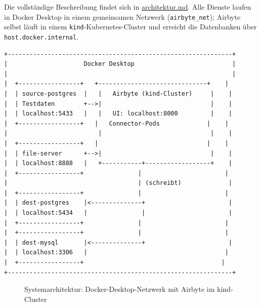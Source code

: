 \documentclass[a4paper,12pt]{article}
\begin{document}
Die vollständige Beschreibung findet sich in
\href{https://github.com/Timbo3399/INFM_Airbyte/blob/main/docs/architektur.md}{architektur.md}.
Alle Dienste laufen in Docker Desktop in einem gemeinsamen Netzwerk
(\texttt{airbyte\_net}); Airbyte selbst läuft in einem \texttt{kind}-Kubernetes-Cluster
und erreicht die Datenbanken über \texttt{host.docker.internal}.
 
\newsavebox{\archbox}
\begin{lrbox}{\archbox}
\begin{BVerbatim}[fontsize=\small, baselinestretch=1.15]
+--------------------------------------------------------------+
|                     Docker Desktop                           |
|                                                              |
|  +-----------------+   +------------------------------+    |
|  | source-postgres  |   |   Airbyte (kind-Cluster)     |    |
|  | Testdaten        +-->|                              |    |
|  | localhost:5433   |   |   UI: localhost:8000         |    |
|  +-----------------+   |   Connector-Pods             |    |
|                         |                              |    |
|  +-----------------+   |                              |    |
|  | file-server      +-->|                              |    |
|  | localhost:8888   |   +-----------+------------------+    |
|  +-----------------+               |                       |
|                                    | (schreibt)             |
|  +-----------------+               |                       |
|  | dest-postgres    |<--------------+                       |
|  | localhost:5434   |               |                       |
|  +-----------------+               |                       |
|  +-----------------+               |                       |
|  | dest-mysql       |<--------------+                       |
|  | localhost:3306   |                                      |
|  +-----------------+                                      |
+--------------------------------------------------------------+
\end{BVerbatim}
\end{lrbox}
 
\begin{figure}[H]
    \centering
    \setlength{\fboxsep}{8pt}%
    \colorbox{codeBox}{\usebox{\archbox}}
    \caption{Systemarchitektur: Docker-Desktop-Netzwerk mit Airbyte im kind-Cluster}
\end{figure}
 
\end{document}
